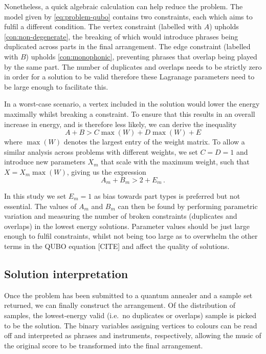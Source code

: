 \documentclass[12pt]{article}
\theoremstyle{definition}
\begin{document}
Nonetheless, a quick algebraic calculation can help reduce the problem. The model given by \cref{eq:problem-qubo} contains two constraints, each which aims to fulfil a different condition. The vertex constraint (labelled with $A$) upholds \cref{con:non-degenerate}, the breaking of which would introduce phrases being duplicated across parts in the final arrangement. The edge constraint (labelled with $B$) upholds \cref{con:monophonic}, preventing phrases that overlap being played by the same part. The number of duplicates and overlaps needs to be strictly zero in order for a solution to be valid therefore these Lagranage parameters need to be large enough to facilitate this.

In a worst-case scenario, a vertex included in the solution would lower the energy maximally whilst breaking a constraint. To ensure that this results in an overall increase in energy, and is therefore less likely, we can derive the inequality
\begin{equation}
    A + B > C\max(W) + D\max(W) + E
\end{equation}
where $\max(W)$ denotes the largest entry of the weight matrix. To allow a similar analysis across problems with different weights, we set $C=D=1$ and introduce new parameters $X_m$ that scale with the maximum weight, such that $X = X_m\max(W)$, giving us the expression
\begin{equation}
    A_m + B_m > 2 + E_m \,.
    \label{eq:lagrange}
\end{equation}

In this study we set $E_m=1$ as bias towards part types is preferred but not essential. The values of $A_m$ and $B_m$ can then be found by performing parametric variation and measuring the number of broken constraints (duplicates and overlaps) in the lowest energy solutions. Parameter values should be just large enough to fulfil constraints, whilst not being too large as to overwhelm the other terms in the QUBO equation [CITE] and affect the quality of solutions.

\subsection{Solution interpretation}

Once the problem has been submitted to a quantum annealer and a sample set returned, we can finally construct the arrangement. Of the distribution of samples, the lowest-energy valid (i.e.\ no duplicates or overlaps) sample is picked to be the solution. The binary variables assigning vertices to colours can be read off and interpreted as phrases and instruments, respectively, allowing the music of the original score to be transformed into the final arrangement.
\end{document}
